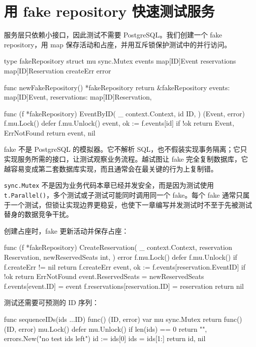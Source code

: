 \section{用 fake repository 快速测试服务}

服务层只依赖小接口，因此测试不需要 PostgreSQL。我们创建一个 fake repository，用 map 保存活动和占座，并用互斥锁保护测试中的并行访问。

\begin{gocode}[title={代码清单 12.21 \texttt{service\_test.go}：内存 fake repository}]
type fakeRepository struct {
    mu           sync.Mutex
    events       map[ID]Event
    reservations map[ID]Reservation
    createErr    error
}

func newFakeRepository() *fakeRepository {
    return &fakeRepository{
        events:       map[ID]Event{},
        reservations: map[ID]Reservation{},
    }
}

func (f *fakeRepository) EventByID(
    _ context.Context,
    id ID,
) (Event, error) {
    f.mu.Lock()
    defer f.mu.Unlock()
    event, ok := f.events[id]
    if !ok {
        return Event{}, ErrNotFound
    }
    return event, nil
}
\end{gocode}

fake 不是 PostgreSQL 的模拟器。它不解析 SQL，也不假装实现事务隔离；它只实现服务所需的接口，让测试观察业务流程。越试图让 fake 完全复制数据库，它越容易变成第二套数据库实现，而且通常会在最关键的行为上复制错。

\texttt{sync.Mutex} 不是因为业务代码本章已经并发安全，而是因为测试使用 \texttt{t.Parallel()}，多个测试或子测试可能同时调用同一个 fake。每个 fake 通常只属于一个测试，但锁让实现边界更稳妥，也使下一章编写并发测试时不至于先被测试替身的数据竞争干扰。

创建占座时，fake 更新活动并保存占座：

\begin{gocode}[]
func (f *fakeRepository) CreateReservation(
    _ context.Context,
    reservation Reservation,
    newReservedSeats int,
) error {
    f.mu.Lock()
    defer f.mu.Unlock()
    if f.createErr != nil {
        return f.createErr
    }
    event, ok := f.events[reservation.EventID]
    if !ok {
        return ErrNotFound
    }
    event.ReservedSeats = newReservedSeats
    f.events[event.ID] = event
    f.reservations[reservation.ID] = reservation
    return nil
}
\end{gocode}

测试还需要可预测的 ID 序列：

\begin{gocode}[]
func sequenceIDs(ids ...ID) func() (ID, error) {
    var mu sync.Mutex
    return func() (ID, error) {
        mu.Lock()
        defer mu.Unlock()
        if len(ids) == 0 {
            return "", errors.New("no test ids left")
        }
        id := ids[0]
        ids = ids[1:]
        return id, nil
    }
}
\end{gocode}

